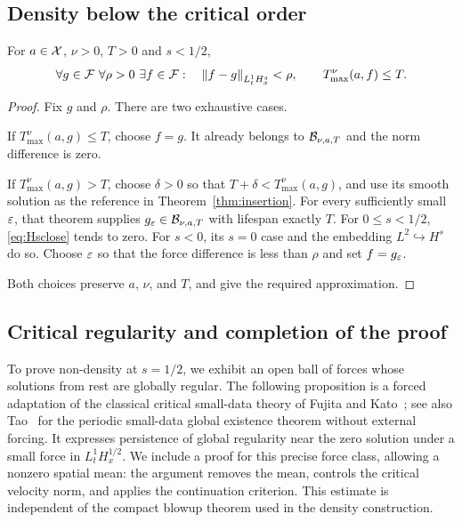 \subsection{Density below the critical order}\label{sec:density}
\begin{proposition}\label{prop:density}
For $a\in\mathcal X$, $\nu>0$, $T>0$ and $s<1/2$,
\[
 \forall g\in\mathcal F\ \forall\rho>0\ \exists f\in\mathcal F:
 \quad \left\lVert f-g\right\rVert_{L^1_tH^s_x}<\rho,\qquad
       T_{\max}^{\nu}(a,f)\le T.
\]
\end{proposition}
\begin{proof}
Fix $g$ and $\rho$. There are two exhaustive cases.

If $T_{\max}^{\nu}(a,g)\le T$, choose $f=g$. It already belongs to
$\mathcal B_{\nu,a,T}$ and the norm difference is zero.

If $T_{\max}^{\nu}(a,g)>T$, choose $\delta>0$ so that
$T+\delta<T_{\max}^{\nu}(a,g)$, and use its smooth solution as the reference in Theorem~\ref{thm:insertion}. For every sufficiently small $\varepsilon$, that theorem supplies $g_\varepsilon\in\mathcal B_{\nu,a,T}$ with lifespan exactly $T$.
For $0\le s<1/2$, \eqref{eq:Hsclose} tends to zero. For $s<0$, its $s=0$ case and the embedding $L^2\hookrightarrow H^s$ do so. Choose $\varepsilon$ so that the force difference is less than $\rho$ and set $f=g_\varepsilon$.

Both choices preserve $a$, $\nu$, and $T$, and give the required approximation.
\end{proof}

\subsection{Critical regularity and completion of the proof}\label{sec:critical}
To prove non-density at $s=1/2$, we exhibit an open ball of forces whose
solutions from rest are globally regular. The following proposition is a
forced adaptation of the classical critical small-data theory of Fujita
and Kato~\cite{fujita}; see also Tao~\cite[Theorem~45]{tao2018} for the
periodic small-data global existence theorem without external forcing.
It expresses persistence of global regularity near the zero solution
under a small force in $L^1_tH^{1/2}_x$. We include a proof for this
precise force class, allowing a nonzero spatial mean: the argument removes
the mean, controls the critical velocity norm, and applies the continuation
criterion. This estimate is independent of the compact blowup theorem
used in the density construction.

